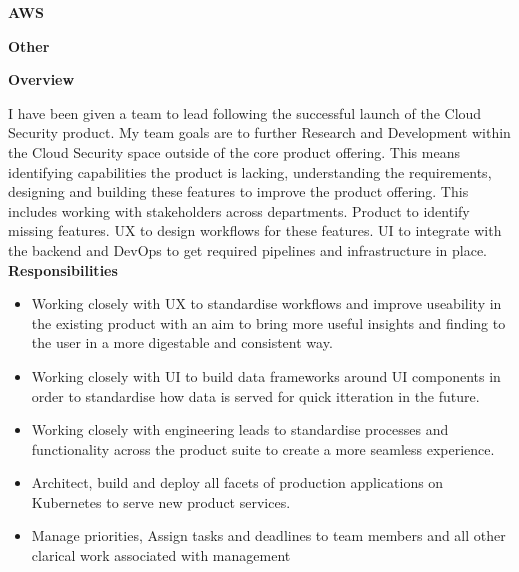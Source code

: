 \documentclass[10pt,a4paper]{altacv}
\begin{document}
\divider 

\textbf{AWS}


\divider

\textbf{Other}


\divider
\textbf{Overview}

I have been given a team to lead following the successful launch of the Cloud Security product. My team goals are to further Research and Development within the Cloud Security space outside of the core product offering. This means identifying capabilities the product is lacking, understanding the requirements, designing and building these features to improve the product offering. This includes working with stakeholders across departments. Product to identify missing features. UX to design workflows for these features. UI to integrate with the backend and DevOps to get required pipelines and infrastructure in place.   
\newline
\newline
\textbf{Responsibilities}
\begin{itemize}
  \item Working closely with UX to standardise workflows and improve useability in the existing product with an aim to bring more useful insights and finding to the user in a more digestable and consistent way.
  \item Working closely with UI to build data frameworks around UI components in order to standardise how data is served for quick itteration in the future. 
  \item Working closely with engineering leads to standardise processes and functionality across the product suite to create a more seamless experience.
  \item Architect, build and deploy all facets of production applications on Kubernetes to serve new product services.
  \item Manage priorities, Assign tasks and deadlines to team members and all other clarical work associated with management
\end{itemize}

\newpage

\end{document}
